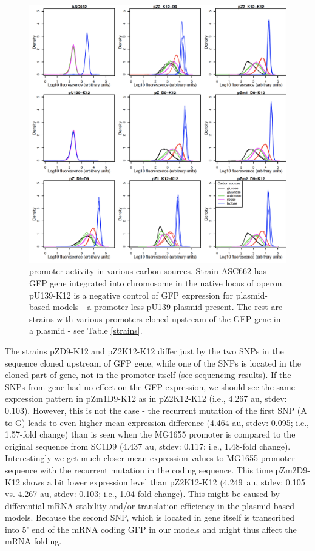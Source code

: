 \begin{figure}[ht!]
  \centering
  \includegraphics[scale=0.4]{text/Pictures/lacZassay.png}
    \caption{ promoter activity in various carbon sources. Strain ASC662 has GFP gene integrated into chromosome in the native locus of  operon. pU139-K12 is a negative control of GFP expression for plasmid-based models - a promoter-less pU139 plasmid present. The rest are strains with various  promoters cloned upstream of the GFP gene in a plasmid - see Table \ref{strains}.}
    \label{lacZassay}
\end{figure}

The strains pZ\textunderscore D9-K12 and pZ2\textunderscore K12-K12 differ just by the two SNPs in the sequence cloned upstream of GFP gene, while one of the SNPs is located in the cloned part of  gene, not in the promoter itself (see \hyperlink{SeqRes}{sequencing results}).
If the SNPs from  gene had no effect on the GFP expression, we should see the same expression pattern in pZm1\textunderscore D9-K12 as in pZ2\textunderscore K12-K12 (i.e., 4.267 au, stdev: 0.103).
However, this is not the case - the recurrent mutation of the first SNP (A to G) leads to even higher mean expression difference (4.464 au, stdev: 0.095; i.e., 1.57-fold change) than is seen when the MG1655 promoter is compared to the original sequence from SC1\textunderscore D9 (4.437 au, stdev: 0.117; i.e., 1.48-fold change).
Interestingly we get much closer mean expression values to MG1655 promoter sequence with the recurrent mutation in the  coding sequence.
This time pZm2\textunderscore D9-K12 shows a bit lower expression level than pZ2\textunderscore K12-K12 (4.249~au, stdev: 0.105 vs. 4.267 au, stdev: 0.103; i.e., 1.04-fold change).
This might be caused by differential mRNA stability and/or translation efficiency in the plasmid-based models.
Because the second SNP, which is located in  gene itself is transcribed into 5' end of the mRNA coding GFP in our models and might thus affect the mRNA folding.


